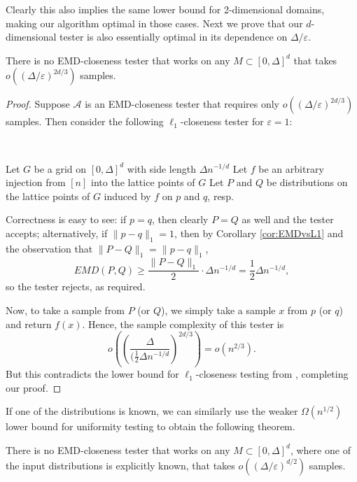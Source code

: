 \documentclass[11pt]{article}
\newcommand{\A}{\mathcal{A}}
\newcommand{\eps}{\varepsilon}
\begin{document}
Clearly this also implies the same lower bound for 2-dimensional domains, making our
algorithm optimal in those cases. Next we prove that our $d$-dimensional tester is
also essentially optimal in its dependence on $\Delta/\eps$.

\begin{theorem}
	There is no EMD-closeness tester that works on any $M \subset [0,\Delta]^d$ that
	takes $o((\Delta/\eps)^{2d/3})$ samples.
\end{theorem}

\begin{proof}
	Suppose $\A$ is an EMD-closeness tester that requires only $o((\Delta/\eps)^{2d/3})$
	samples. Then consider the following $\ell_1$-closeness tester for $\eps=1$:

	\FuncSty{$\ell_1$-Tester$(p,q,\eps=1)$}\\
	\begin{algorithm}[H]
		Let $G$ be a grid on $[0,\Delta]^d$ with side length $\Delta n^{-1/d}$\;
		Let $f$ be an arbitrary injection from $[n]$ into the lattice points of $G$\;
		Let $P$ and $Q$ be distributions on the lattice points of $G$ induced by
			$f$ on $p$ and $q$, resp.\;
		\Return{$\A(P,Q,\frac{1}{2} \Delta n^{-1/d})$}\;
	\end{algorithm}

	Correctness is easy to see: if $p=q$, then clearly $P=Q$ as well and the tester
	accepts; alternatively, if $\|p-q\|_1 = 1$, then by Corollary \ref{cor:EMDvsL1}
	and the observation that $\|P-Q\|_1 = \|p-q\|_1$,
	\[
		EMD(P,Q) \ge \frac{\|P-Q\|_1}{2} \cdot \Delta n^{-1/d}
			=      \frac{1}{2} \Delta n^{-1/d},
	\]
	so the tester rejects, as required.

	Now, to take a sample from $P$ (or $Q$), we simply take a sample
	$x$ from $p$ (or $q$) and return $f(x)$. Hence, the sample complexity of this
	tester is
	\[
		o\left(\left(\frac{\Delta}{(\frac{1}{2} \Delta n^{-1/d}}\right)^{2d/3}\right)
			= o(n^{2/3}).
	\]
	But this contradicts the lower bound for $\ell_1$-closeness testing from
	\cite{L1tester,valiant}, completing our proof.
\end{proof}

If one of the distributions is known, we can similarly
use the weaker $\Omega(n^{1/2})$ lower bound for uniformity testing to obtain the
following theorem.

\begin{theorem}
	There is no EMD-closeness tester that works on any $M \subset [0,\Delta]^d$, where
	one of the input distributions is explicitly known, that takes $o((\Delta/\eps)^{d/2})$
	samples.
\end{theorem}
\end{document}
